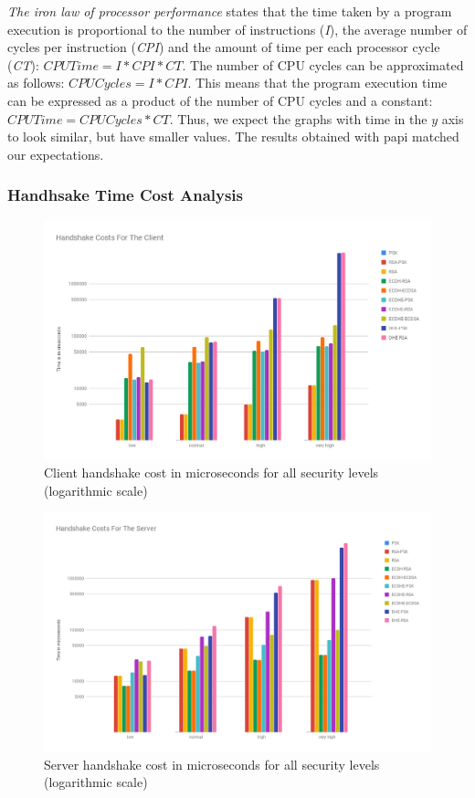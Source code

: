 \textit{The iron law of processor performance}\cite{yadin2016computer} states that the time
taken by a program execution is proportional to the number of instructions (\textit{I}), 
the average number of cycles per instruction (\textit{CPI}) and the amount of time per each processor
cycle (\textit{CT}): $CPU Time = I * CPI * CT$. The number of CPU cycles can be approximated as 
follows: $CPU Cycles = I * CPI$. This means that the program execution time can be expressed 
as a product of the number of CPU cycles and a constant: $CPU Time = CPU Cycles * CT$.
Thus, we expect the graphs with time in the $y$ axis to look similar, but have smaller
values. The results obtained with \gls{papi} matched our expectations.

\subsubsection{Handhsake Time Cost Analysis} \label{sec:papi-handshake}

\begin{figure}
  \centering
  \includegraphics[width=1.0\textwidth]{img/hs_papi_client.png}
  \centering \caption{\label{fig:client-hs-cost-all-sls-papi} Client handshake cost in microseconds for all security levels (logarithmic scale)}
\end{figure}

\begin{figure}
  \centering
  \includegraphics[width=1.0\textwidth]{img/hs_papi_server.png}
  \centering \caption{\label{fig:server-hs-cost-all-sls-papi} Server handshake cost in microseconds for all security levels (logarithmic scale)}
\end{figure}

